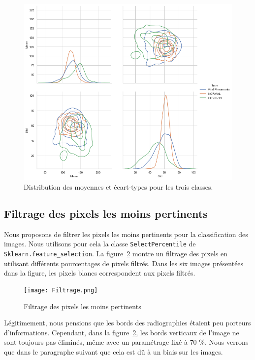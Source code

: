 \documentclass[11pt,twoside,openright]{article}
\def\code#1{\texttt{#1}}
\begin{document}
\begin{figure}[htbp]
\centering
\includegraphics[width=14cm]{Histos_gray_level.png}
\caption{Distribution des moyennes et écart-types pour les trois classes.}
\label{fig:Histos_gray_level}
\end{figure}

\subsection{Filtrage des pixels les moins pertinents}
Nous proposons de filtrer les pixels les moins pertinents pour la classification des images. Nous utilisons pour cela la classe \code{SelectPercentile} de \code{Sklearn.feature\_selection}. La figure~\ref{fig:filtrage} montre un filtrage des pixels en utilisant différents pourcentages de pixels filtrés. Dans les six images présentées dans la figure, les pixels blancs correspondent aux pixels filtrés.
\begin{figure}[htbp]
\centering
\texttt{[image: Filtrage.png]}
\caption{Filtrage des pixels les moins pertinents}
\label{fig:filtrage}
\end{figure}

Légitimement, nous pensions que les bords des radiographies étaient peu porteurs d'informations.
Cependant, dans la figure~\ref{fig:filtrage}, les bords verticaux de l'image ne sont toujours pas éliminés, même avec un paramétrage fixé à 70 \%.
Nous verrons que dans le paragraphe suivant que cela est dû à un biais sur les images.
\end{document}
